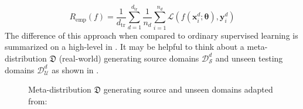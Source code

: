 \begin{equation}
\label{eq:domain_risk_emp}
    R_\mathrm{emp}(f) = \frac{1}{d_\mathrm{tr}} \sum_{d=1}^{d_\mathrm{tr}} \frac{1}{n_d} \sum_{i=1}^{n_d} \mathcal{L}(f(\mathbf{x}_i^{d}; \boldsymbol{\theta}), \mathbf{y}_i^{d})
\end{equation}
The difference of this approach when compared to ordinary supervised learning is summarized on a high-level in . It may be helpful to think about a meta-distribution $\mathfrak{D}$ (real-world) generating source domains $\mathcal{D}^d_\mathcal{S}$ and unseen testing domains $\mathcal{D}^d_\mathcal{U}$ as shown in .
\begin{figure}[htbp]
    \centering
    \caption[Meta-distribution $\mathfrak{D}$ generating source and unseen domains]{Meta-distribution $\mathfrak{D}$ generating source and unseen domains adapted from: \citep{albuquerque2019generalizing}}
    \label{fig:meta_domain}
\end{figure}

